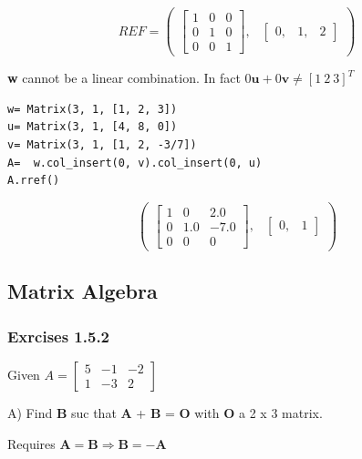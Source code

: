 \begin{equation}
REF= \begin{pmatrix}\left[\begin{matrix}1 & 0 & 0\\0 & 1 & 0\\0 & 0 & 1\end{matrix}\right], & \begin{bmatrix}0, & 1, & 2\end{bmatrix}\end{pmatrix}
\end{equation}

\textbf{w} cannot be a linear combination. In fact
$0\mathbf{u} + 0\mathbf{v} \neq [1\ 2\ 3]^T$

\begin{verbatim}
w= Matrix(3, 1, [1, 2, 3])
u= Matrix(3, 1, [4, 8, 0])
v= Matrix(3, 1, [1, 2, -3/7])
A=  w.col_insert(0, v).col_insert(0, u)
A.rref()
\end{verbatim}

\begin{equation}\label{eq:}
\begin{pmatrix}\left[\begin{matrix}1 & 0 & 2.0\\0 & 1.0 & -7.0\\0 & 0 & 0\end{matrix}\right], & \begin{bmatrix}0, & 1\end{bmatrix}\end{pmatrix}
\end{equation}

\subsection{Matrix Algebra}

\subsubsection{Exrcises 1.5.2}

Given $A = \left[\begin{matrix}5 & -1 & -2\\1 & -3 & 2\end{matrix}\right]$

A) Find \textbf{B} suc that \textbf{A} + \textbf{B} = \textbf{O} with \textbf{O}
a 2 x 3 matrix.

Requires $\mathbf{A} = \mathbf{B} \Rightarrow \mathbf{B} = -\mathbf{A}$

